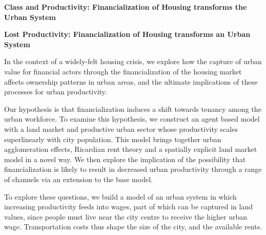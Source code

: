 \begin{center}\textbf{Class and  Productivity: Financialization of Housing transforms the Urban System}\end{center}
\begin{center}\textbf{Lost Productivity: Financialization of Housing transforms an Urban System}\end{center}

In the context of a widely-felt housing crisis, we explore how the capture of urban value for financial actors through the financialization of the housing market affects ownership patterns in urban areas, and the ultimate implications of these processes for urban productivity.


Our hypothesis is that financialization induces a shift towards tenancy among the urban workforce. To examine this hypothesis, we construct an agent based model with a land market and productive urban sector whose productivity scales superlinearly with city population. This model brings together urban agglomeration effects, Ricardian rent theory and a spatially explicit land market model in a novel way. We then explore the implication of the possibility that financialization is likely to result in decreased urban productivity through a range of channels via an extension to the base model. 

To explore these questions, we build a model of an urban system in which 
increasing productivity feeds into wages, part of which can be captured in land values, since people must live near the city centre to receive the higher urban wage. Transportation costs thus shape the size of the city, and the available rents. %

